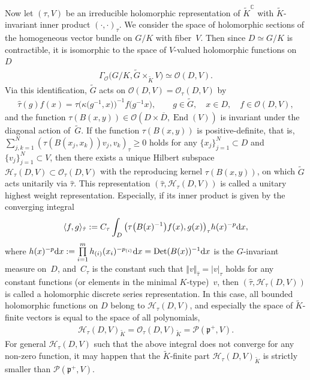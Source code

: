\documentclass[pdftex]{sigma}
\numberwithin{equation}{section}
\newcommand{\BC}{\mathbb{C}}
\newcommand{\fp}{\mathfrak{p}}
\newcommand{\cH}{\mathcal{H}}
\newcommand{\cO}{\mathcal{O}}
\newcommand{\cP}{\mathcal{P}}
\newcommand{\End}{\operatorname{End}}
\newcommand{\Det}{\operatorname{Det}}
\begin{document}
Now let $(\tau,V)$ be an irreducible holomorphic representation of $\tilde{K}^\BC$ with $\tilde{K}$-invariant inner product $(\cdot,\cdot)_\tau$.
We consider the space of holomorphic sections of the homogeneous vector bundle on $G/K$ with fiber~$V$. Then since $D\simeq G/K$ is contractible, it is isomorphic to the space of $V$-valued holomorphic functions on~$D$
\begin{gather*} \Gamma_\cO\big(G/K, \tilde{G}\times_{\tilde{K}}V\big)\simeq \cO(D,V). \end{gather*}
Via this identification, $\tilde{G}$ acts on $\cO(D,V)=\cO_\tau(D,V)$ by
\begin{gather*} \hat{\tau}(g)f(x)=\tau\big(\kappa\big(g^{-1},x\big)\big)^{-1}f\big(g^{-1}x\big),\qquad g\in\tilde{G}, \quad x\in D, \quad f\in\cO(D,V) , \end{gather*}
and the function $\tau(B(x,y))\in \cO(D\times\overline{D},\End(V))$ is invariant under the diagonal action of~$\tilde{G}$.
If the function $\tau(B(x,y))$ is positive-definite, that is,
$\sum\limits_{j,k=1}^N(\tau(B(x_j,x_k))v_j,v_k)_\tau\ge 0$ holds for any $\{x_j\}_{j=1}^N\subset D$ and $\{v_j\}_{j=1}^N\subset V$,
then there exists a unique Hilbert subspace $\cH_\tau(D,V)\subset\cO_\tau(D,V)$ with the reproducing kernel $\tau(B(x,y))$,
on which $\tilde{G}$ acts unitarily via $\hat{\tau}$.
This representation $(\hat{\tau},\cH_\tau(D,V))$ is called a unitary highest weight representation.
Especially, if its inner product is given by the converging integral
\begin{gather*} \langle f,g\rangle_{\hat{\tau}}:=C_\tau\int_D \big(\tau\big(B(x)^{-1}\big)f(x),g(x)\big)_{\tau}h(x)^{-p}{\rm d}x, \end{gather*}
where $h(x)^{-p}{\rm d}x:=\prod\limits_{i=1}^m h_{(i)}(x_i)^{-p_{(i)}}{\rm d}x=\Det(B(x))^{-1}{\rm d}x$ is the $G$-invariant measure on~$D$,
and~$C_\tau$ is the constant such that $\Vert v\Vert_{\hat{\tau}}=|v|_\tau$ holds for any constant functions
(or elements in the minimal $K$-type)~$v$,
then $(\hat{\tau},\cH_\tau(D,V))$ is called a holomorphic discrete series representation.
In this case, all bounded holomorphic functions on $D$ belong to $\cH_\tau(D,V)$,
and especially the space of $\tilde{K}$-finite vectors is equal to the space of all polynomials,
\begin{gather*} \cH_\tau(D,V)_{\tilde{K}}=\cO_\tau(D,V)_{\tilde{K}}=\cP(\fp^+,V). \end{gather*}
For general $\cH_\tau(D,V)$ such that the above integral does not converge for any non-zero function,
it may happen that the $\tilde{K}$-finite part $\cH_\tau(D,V)_{\tilde{K}}$ is strictly smaller than $\cP(\fp^+,V)$.
\end{document}

